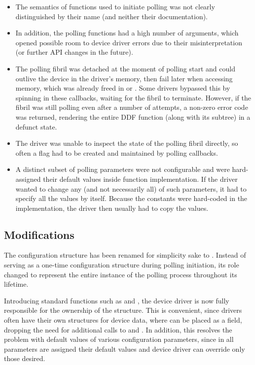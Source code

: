 \begin{itemize}
	\item The semantics of functions used to initiate polling was not clearly
		distinguished by their name (and neither their documentation).
	\item In addition, the polling functions had a high number of arguments,
		which opened possible room to device driver errors due to their
		misinterpretation (or further API changes in the future).
	\item The polling fibril was detached at the moment of polling start and
		could outlive the device in the driver's memory, then fail later when
		accessing memory, which was already freed in  or
		. Some drivers bypassed this by spinning in these callbacks,
		waiting for the fibril to terminate. However, if the fibril was still
		polling even after a number of attempts, a non-zero error code was returned,
		rendering the entire DDF function (along with its subtree) in a defunct
		state.
	\item The driver was unable to inspect the state of the polling fibril
		directly, so often a flag had to be created and maintained by polling
		callbacks.
	\item A distinct subset of polling parameters were not configurable and were
		hard-assigned their default values inside function implementation. If the
		driver wanted to change any (and not necessarily all) of such parameters, it
		had to specify all the values by itself. Because the constants were
		hard-coded in the implementation, the driver then usually had to copy the
		values.
\end{itemize}


\subsection{Modifications}

The configuration structure  has been renamed
for simplicity sake to . Instead of serving as a one-time
configuration structure during polling initiation, its role changed to represent
the entire instance of the polling process throughout its lifetime.

Introducing standard functions such as  and
, the device driver is now fully responsible for the
ownership of the structure. This is convenient, since drivers often have their
own structures for device data, where  can be placed as a
field, dropping the need for additional calls to  and
. In addition, this resolves the problem with default values of
various configuration parameters, since in  all
parameters are assigned their default values and device driver can override only
those desired.

